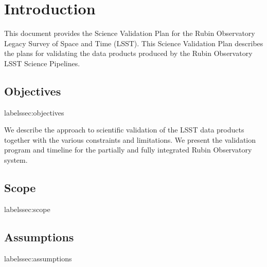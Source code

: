 \section{Introduction}  \label{sec:intro}

This document provides the Science Validation Plan for the Rubin Observatory Legacy Survey of Space and Time (LSST). 
This Science Validation Plan describes the plans for validating the data products produced by the Rubin Observatory LSST Science Pipelines. 

\subsection{Objectives}   label{ssec:objectives} 

We describe the approach to scientific validation of the LSST data products together with the various constraints and limitations. 
We present the validation program and timeline for the partially and fully integrated Rubin Observatory system. 


\subsection{Scope}   label{ssec:scope}


\subsection{Assumptions}   label{ssec:assumptions }



